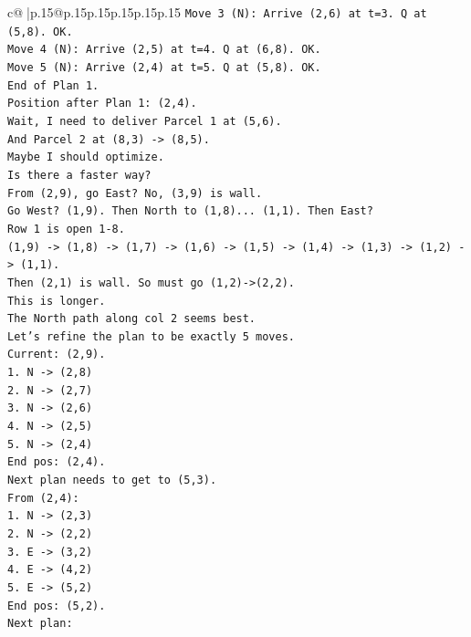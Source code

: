 \documentclass{article}
\begin{document}
{\begin{supertabular}{c@{$\;$}|p{.15\linewidth}@{}p{.15\linewidth}p{.15\linewidth}p{.15\linewidth}p{.15\linewidth}p{.15\linewidth}}
{{{\texttt{Move 3 (N): Arrive (2,6) at t=3. Q at (5,8). OK.} \\
\texttt{Move 4 (N): Arrive (2,5) at t=4. Q at (6,8). OK.} \\
\texttt{Move 5 (N): Arrive (2,4) at t=5. Q at (5,8). OK.} \\
\texttt{End of Plan 1.} \\
\texttt{Position after Plan 1: (2,4).} \\
\texttt{Wait, I need to deliver Parcel 1 at (5,6).} \\
\texttt{And Parcel 2 at (8,3) {-}> (8,5).} \\
\texttt{Maybe I should optimize.} \\
\texttt{Is there a faster way?} \\
\texttt{From (2,9), go East? No, (3,9) is wall.} \\
\texttt{Go West? (1,9). Then North to (1,8)... (1,1). Then East?} \\
\texttt{Row 1 is open 1{-}8.} \\
\texttt{(1,9) {-}> (1,8) {-}> (1,7) {-}> (1,6) {-}> (1,5) {-}> (1,4) {-}> (1,3) {-}> (1,2) {-}> (1,1).} \\
\texttt{Then (2,1) is wall. So must go (1,2){-}>(2,2).} \\
\texttt{This is longer.} \\
\texttt{The North path along col 2 seems best.} \\
\texttt{Let's refine the plan to be exactly 5 moves.} \\
\texttt{Current: (2,9).} \\
\texttt{1. N {-}> (2,8)} \\
\texttt{2. N {-}> (2,7)} \\
\texttt{3. N {-}> (2,6)} \\
\texttt{4. N {-}> (2,5)} \\
\texttt{5. N {-}> (2,4)} \\
\texttt{End pos: (2,4).} \\
\texttt{Next plan needs to get to (5,3).} \\
\texttt{From (2,4):} \\
\texttt{1. N {-}> (2,3)} \\
\texttt{2. N {-}> (2,2)} \\
\texttt{3. E {-}> (3,2)} \\
\texttt{4. E {-}> (4,2)} \\
\texttt{5. E {-}> (5,2)} \\
\texttt{End pos: (5,2).} \\
\texttt{Next plan:} \\
}}}
\end{supertabular}}
\end{document}
